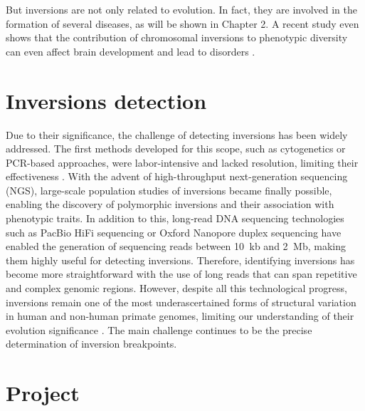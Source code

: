 But inversions are not only related to evolution. In fact, they are involved in the formation of several diseases, as will be shown in Chapter 2. A recent study even shows that the contribution of chromosomal inversions to phenotypic diversity can even affect brain development and lead to disorders \cite{wang_chromosomal_2023}.

\section{Inversions detection}

Due to their significance, the challenge of detecting inversions has been widely addressed. The first methods developed for this scope, such as cytogenetics or PCR-based approaches, were labor‐intensive and lacked resolution, limiting their effectiveness \cite{hu_unravelling_2024}. With the advent of high-throughput next-generation sequencing (NGS), large-scale population studies of inversions became finally possible, enabling the discovery of polymorphic inversions and their association with phenotypic traits.
In addition to this, long‐read DNA sequencing technologies such as PacBio HiFi sequencing or Oxford Nanopore duplex sequencing have enabled the generation of sequencing reads between 10  kb and 2  Mb, making them highly useful for detecting inversions. Therefore, identifying inversions has become more straightforward with the use of long reads that can span repetitive and complex genomic regions. However, despite all this technological progress, inversions remain one of the most underascertained forms of structural variation in human and non-human primate genomes, limiting our understanding of their evolution significance \cite{porubsky_recurrent_2020}. The main challenge continues to be the precise determination of inversion breakpoints.

\section{Project}

